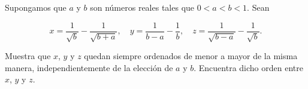 Supongamos que $a$ y $b$ son números reales tales que $0 \lt a \lt b \lt 1$. Sean

\[x = \frac{1}{\sqrt b}-\frac{1}{\sqrt{b+a}},\quad y = \frac{1}{b-a}-\frac{1}{b},\quad z = \frac{1}{\sqrt{b-a}}-\frac{1}{\sqrt b}.\]

Muestra que $x$, $y$ y $z$ quedan siempre ordenados de menor a mayor de la misma manera, independientemente de la elección de $a$ y $b$. Encuentra dicho orden entre $x$, $y$ y $z$.